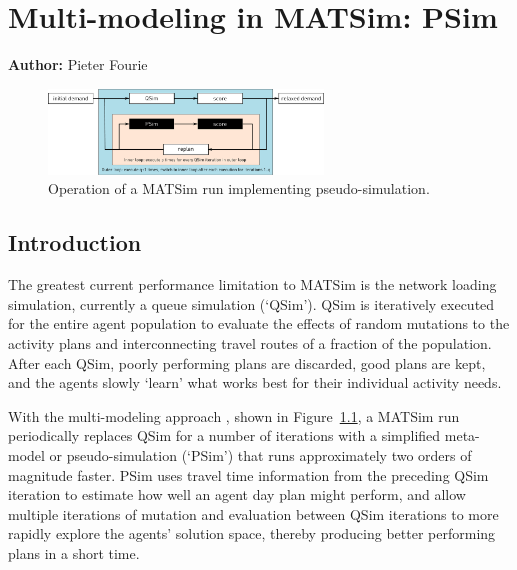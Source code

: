 \chapter{Multi-modeling in MATSim: PSim }
\label{ch:psim}

\hfill \textbf{Author:} Pieter Fourie
\begin{figure}
\label{fig:PSim}
\begin{center} \includegraphics[width=0.65\textwidth, angle=0]{extending/figures/PSim/psim.pdf} \end{center}
\caption{Operation of a MATSim run implementing pseudo-simulation.}
\end{figure}

\section{Introduction}
The greatest current performance limitation to MATSim is the network loading simulation, currently a queue simulation (‘QSim’). QSim is iteratively executed for the entire agent population to evaluate the effects of random mutations to the activity plans and interconnecting travel routes of a fraction of the population. After each QSim, poorly performing plans are discarded, good plans are kept, and the agents slowly ‘learn’ what works best for their individual activity needs. 

With the multi-modeling approach \citep[][]{FourieEtAl_TRR_2013}, shown in Figure~\ref{fig:PSim}, a MATSim run periodically replaces QSim for a number of iterations with a simplified meta-model or pseudo-simulation (‘PSim’) that runs approximately two orders of magnitude faster. PSim uses travel time information from the preceding QSim iteration to estimate how well an agent day plan might perform, and allow multiple iterations of mutation and evaluation between QSim iterations to more rapidly explore the agents' solution space, thereby producing better performing plans in a short time.

